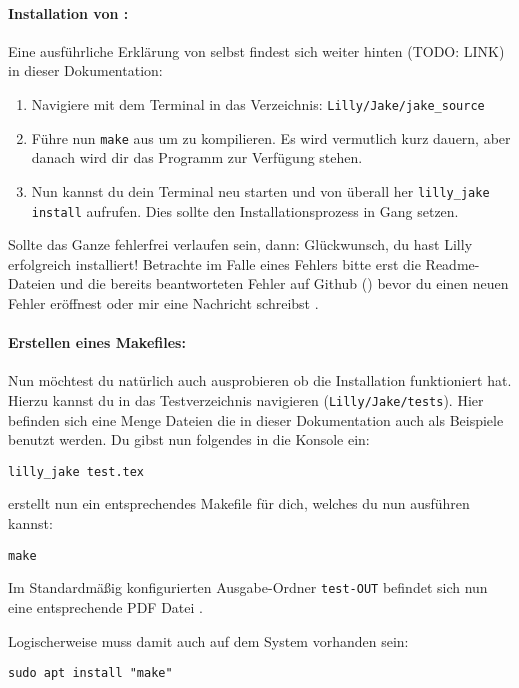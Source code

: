 \paragraph{Installation von \Jake:}Eine ausführliche Erklärung von \Jake selbst findest sich weiter hinten (TODO: LINK) in dieser Dokumentation:\smallskip
{}
\begin{enumerate}\setlength{\itemsep}{0.25\baselineskip}
    \item Navigiere mit dem Terminal in das Verzeichnis: \verb|Lilly/Jake/jake_source|
    \item Führe nun \verb|make| aus um \Jake zu kompilieren.
          Es wird vermutlich kurz dauern, aber danach wird dir das Programm \LJake zur Verfügung stehen.
    \item Nun kannst du dein Terminal neu starten und von überall her \verb|lilly_jake install| aufrufen.
          Dies sollte den Installationsprozess in Gang setzen.\smallskip
\end{enumerate}
Sollte das Ganze fehlerfrei verlaufen sein, dann: Glückwunsch, du hast Lilly erfolgreich installiert!
Betrachte im Falle eines Fehlers bitte erst die Readme-Dateien und die bereits beantworteten Fehler
auf Github (\href{https://github.com/EagleoutIce/LILLY/issues}{\faGithub}) bevor du einen neuen Fehler
eröffnest oder mir eine Nachricht schreibst \Smiley.
\paragraph{Erstellen eines Makefiles:}
Nun möchtest du natürlich auch ausprobieren ob die Installation funktioniert hat.
Hierzu kannst du in das Testverzeichnis navigieren (\verb|Lilly/Jake/tests|).
Hier befinden sich eine Menge Dateien die in dieser Dokumentation auch als Beispiele benutzt werden.
Du gibst nun folgendes in die Konsole ein:
\begin{lstlisting}[language=lBash]
lilly_jake test.tex
\end{lstlisting}
\Jake erstellt nun ein entsprechendes Makefile für dich, welches du nun ausführen kannst:
\begin{lstlisting}[language=lBash]
make
\end{lstlisting}
Im Standardmäßig konfigurierten Ausgabe-Ordner \verb|test-OUT| befindet sich nun eine entsprechende PDF
Datei \Smiley.\smallskip
\begin{bemerkung}[make]
    Logischerweise muss damit auch  auf dem System vorhanden sein:
\begin{lstlisting}[language=lBash]
sudo apt install "make"
\end{lstlisting}
\end{bemerkung}
